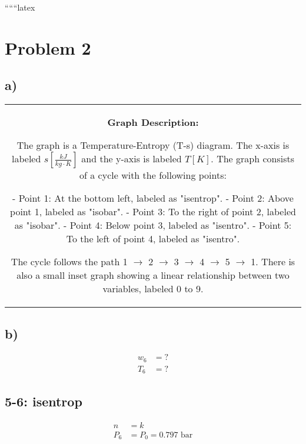 
``````latex


\section*{Problem 2}

\subsection*{a)}

\begin{center}
\begin{tabular}{c}
\begin{minipage}{0.5\textwidth}
\begin{center}
\textbf{Graph Description:}
\end{center}
The graph is a Temperature-Entropy (T-s) diagram. The x-axis is labeled $s \left[ \frac{kJ}{kg \cdot K} \right]$ and the y-axis is labeled $T \left[ K \right]$. The graph consists of a cycle with the following points:

- Point 1: At the bottom left, labeled as "isentrop".
- Point 2: Above point 1, labeled as "isobar".
- Point 3: To the right of point 2, labeled as "isobar".
- Point 4: Below point 3, labeled as "isentro".
- Point 5: To the left of point 4, labeled as "isentro".

The cycle follows the path 1 $\rightarrow$ 2 $\rightarrow$ 3 $\rightarrow$ 4 $\rightarrow$ 5 $\rightarrow$ 1. There is also a small inset graph showing a linear relationship between two variables, labeled 0 to 9.
\end{minipage}
\end{tabular}
\end{center}

\subsection*{b)}

\begin{align*}
w_6 &= ? \\
T_6 &= ?
\end{align*}

\subsection*{5-6: isentrop}

\begin{align*}
n &= k \\
P_6 &= P_0 = 0.797 \text{ bar}
\end{align*}

